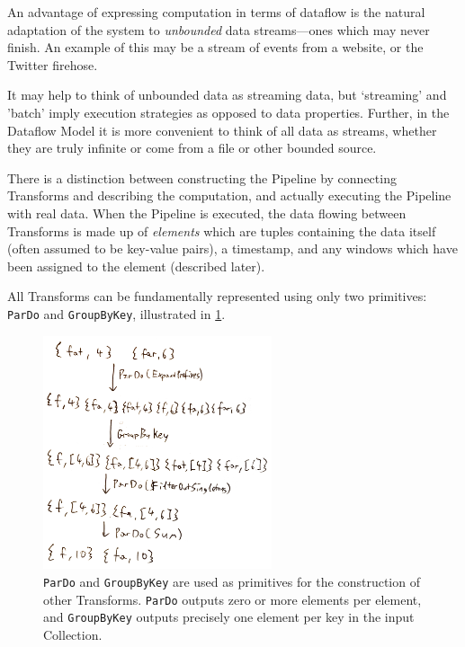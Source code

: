 An advantage of expressing computation in terms of dataflow is the natural adaptation of the system to \emph{unbounded} data streams---ones which may never finish.
An example of this may be a stream of events from a website, or the Twitter firehose.

It may help to think of unbounded data as streaming data, but `streaming' and 'batch' imply execution strategies as opposed to data properties.
Further, in the Dataflow Model it is more convenient to think of all data as streams, whether they are truly infinite or come from a file or other bounded source.

There is a distinction between constructing the Pipeline by connecting Transforms and describing the computation, and actually executing the Pipeline with real data.
When the Pipeline is executed, the data flowing between Transforms is made up of \emph{elements} which are tuples containing the data itself (often assumed to be key-value pairs), a timestamp, and any windows which have been assigned to the element (described later).

All Transforms can be fundamentally represented using only two primitives: \verb|ParDo| and \verb|GroupByKey|, illustrated in \cref{fig:prep:pardo-gbk}.

\begin{figure}[h]
	\centering
	\includegraphics[width=0.6\textwidth]{images/temp/pardo-gbk}
	\caption[An illustration of the operation of \texttt{ParDo} and \texttt{GroupByKey}.]{\texttt{ParDo} and \texttt{GroupByKey} are used as primitives for the construction of other Transforms. \texttt{ParDo} outputs zero or more elements per element, and \texttt{GroupByKey} outputs precisely one element per key in the input Collection.}
	\label{fig:prep:pardo-gbk}
\end{figure}


